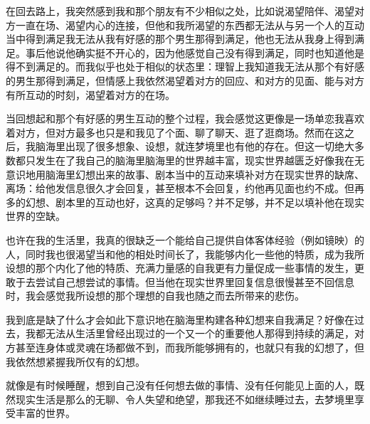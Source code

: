 在回去路上，我突然感到我和那个朋友有不少相似之处，比如说渴望陪伴、渴望对方一直在场、渴望内心的连接，但他和我所渴望的东西都无法从与另一个人的互动当中得到满足\pozhehao{}我无法从我有好感的那个男生那得到满足，他也无法从我身上得到满足。事后他说他确实挺不开心的，因为他感觉自己没有得到满足，同时也知道他是得不到满足的。而我似乎也处于相似的状态里：理智上我知道我无法从那个有好感的男生那得到满足，但情感上我依然渴望着对方的回应、和对方的见面、能与对方有所互动的时刻，渴望着对方的在场。

当回想起和那个有好感的男生互动的整个过程，我会感觉这更像是一场单恋\pozhehao{}我喜欢着对方，但对方最多也只是和我见了个面、聊了聊天、逛了逛商场。然而在这之后，我脑海里出现了很多想象、设想，就连梦境里也有他的存在。但这一切绝大多数都只发生在了我自己的脑海里\pozhehao{}脑海里的世界越丰富，现实世界越匮乏\pozhehao{}好像我在无意识地用脑海里幻想出来的故事、剧本当中的互动来填补对方在现实世界的缺席、离场：给他发信息很久才会回复，甚至根本不会回复，约他再见面也约不成。但再多的幻想、剧本里的互动也好，这真的足够吗？并不足够，并不足以填补他在现实世界的空缺。

也许在我的生活里，我真的很缺乏一个能给自己提供自体客体经验（例如镜映）的人，同时我也很渴望当和他的相处时间长了，我能够内化一些他的特质，成为我所设想的那个内化了他的特质、充满力量感的自我\pozhehao{}更有力量促成一些事情的发生，更敢于去尝试自己想尝试的事情。但当他在现实世界里回复信息很慢甚至不回信息时，我会感觉我所设想的那个理想的自我也随之而去所带来的悲伤。

我到底是缺了什么才会如此下意识地在脑海里构建各种幻想来自我满足？好像在过去，我都无法从生活里曾经出现过的一个又一个的重要他人那得到持续的满足，对方甚至连身体或灵魂在场都做不到，而我所能够拥有的，也就只有我的幻想了，但我依然想紧握我所仅有的幻想。

就像是有时候睡醒，想到自己没有任何想去做的事情、没有任何能见上面的人，既然现实生活是那么的无聊、令人失望和绝望，那我还不如继续睡过去，去梦境里享受丰富的世界。


